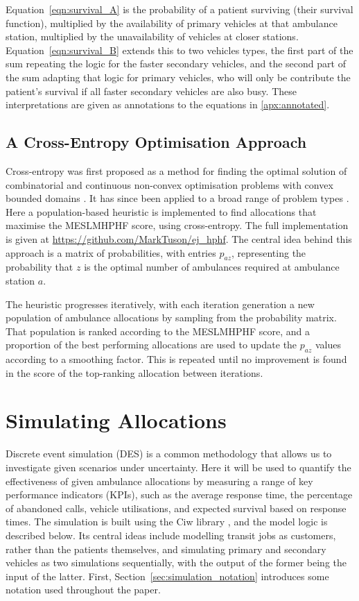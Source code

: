 \documentclass[preprint,12pt]{elsarticle}
\begin{document}
Equation~\ref{eqn:survival_A} is the probability of a patient surviving (their survival function), multiplied by the availability of primary vehicles at that ambulance station, multiplied by the unavailability of vehicles at closer stations.
Equation~\ref{eqn:survival_B} extends this to two vehicles types, the first part of the sum repeating the logic for the faster secondary vehicles, and the second part of the sum adapting that logic for primary vehicles, who will only be contribute the patient's survival if all faster secondary vehicles are also busy. These interpretations are given as annotations to the equations in \ref{apx:annotated}.

\subsection{A Cross-Entropy Optimisation Approach}\label{sec:cross_entropy}
Cross-entropy was first proposed as a method for finding the optimal solution of combinatorial and continuous non-convex optimisation problems with convex bounded domains \cite{RubinsteinReuven1999TCMf}. It has since been applied to a broad range of problem types \cite{deBoerPieter-Tjerk2005ATot}. Here a population-based heuristic is implemented to find allocations that maximise the MESLMHPHF score, using cross-entropy. The full implementation is given at \url{https://github.com/MarkTuson/ej_hphf}. The central idea behind this approach is a matrix of probabilities, with entries $p_{az}$, representing the probability that $z$ is the optimal number of ambulances required at ambulance station $a$.

The heuristic progresses iteratively, with each iteration generation a new population of ambulance allocations by sampling from the probability matrix. That population is ranked according to the MESLMHPHF score, and a proportion of the best performing allocations are used to update the $p_{az}$ values according to a smoothing factor. This is repeated until no improvement is found in the score of the top-ranking allocation between iterations.



\section{Simulating Allocations}\label{sec:simulation}
Discrete event simulation (DES) is a common methodology that allows us to
investigate given scenarios under uncertainty. Here it will be used to quantify
the effectiveness of given ambulance allocations by measuring a range of key
performance indicators (KPIs), such as the average response time, the percentage of abandoned calls,
vehicle utilisations, and expected survival based on response times.
The simulation is built using the Ciw library \cite{palmer2019ciw}, and the
model logic is described below. Its central ideas include modelling transit jobs
as customers, rather than the patients themselves, and simulating primary and
secondary vehicles as two simulations sequentially, with the output of the
former being the input of the latter.
First, Section~\ref{sec:simulation_notation} introduces some notation used throughout the paper.
\end{document}
